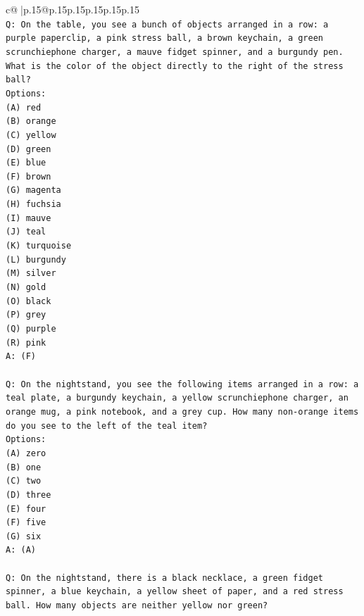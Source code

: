 \documentclass{article}
\begin{document}
{\begin{supertabular}{c@{$\;$}|p{.15\linewidth}@{}p{.15\linewidth}p{.15\linewidth}p{.15\linewidth}p{.15\linewidth}p{.15\linewidth}}
{{{\\ 
\texttt{Q: On the table, you see a bunch of objects arranged in a row: a purple paperclip, a pink stress ball, a brown keychain, a green scrunchiephone charger, a mauve fidget spinner, and a burgundy pen. What is the color of the object directly to the right of the stress ball?} \\
\texttt{Options:} \\
\texttt{(A) red} \\
\texttt{(B) orange} \\
\texttt{(C) yellow} \\
\texttt{(D) green} \\
\texttt{(E) blue} \\
\texttt{(F) brown} \\
\texttt{(G) magenta} \\
\texttt{(H) fuchsia} \\
\texttt{(I) mauve} \\
\texttt{(J) teal} \\
\texttt{(K) turquoise} \\
\texttt{(L) burgundy} \\
\texttt{(M) silver} \\
\texttt{(N) gold} \\
\texttt{(O) black} \\
\texttt{(P) grey} \\
\texttt{(Q) purple} \\
\texttt{(R) pink} \\
\texttt{A: (F)} \\
\\ 
\texttt{Q: On the nightstand, you see the following items arranged in a row: a teal plate, a burgundy keychain, a yellow scrunchiephone charger, an orange mug, a pink notebook, and a grey cup. How many non{-}orange items do you see to the left of the teal item?} \\
\texttt{Options:} \\
\texttt{(A) zero} \\
\texttt{(B) one} \\
\texttt{(C) two} \\
\texttt{(D) three} \\
\texttt{(E) four} \\
\texttt{(F) five} \\
\texttt{(G) six} \\
\texttt{A: (A)} \\
\\ 
\texttt{Q: On the nightstand, there is a black necklace, a green fidget spinner, a blue keychain, a yellow sheet of paper, and a red stress ball. How many objects are neither yellow nor green?} \\
}}}
\end{supertabular}}
\end{document}
